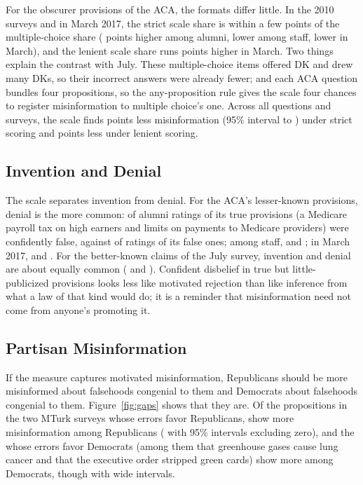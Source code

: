 \documentclass[11pt]{article}
\begin{document}
For the obscurer provisions of the ACA, the formats differ little. In the 2010 surveys and in March 2017, the strict scale share is within a few points of the multiple-choice share (\alumniStrict{} points higher among alumni, \staffStrict{} lower among staff, \marchStrict{} lower in March), and the lenient scale share runs \marchLenient{} points higher in March. Two things explain the contrast with July. These multiple-choice items offered DK and drew many DKs, so their incorrect answers were already fewer; and each ACA question bundles four propositions, so the any-proposition rule gives the scale four chances to register misinformation to multiple choice's one. Across all questions and surveys, the scale finds \pooledStrict{} points less misinformation (95\% interval \pooledStrictLower{} to \pooledStrictUpper{}) under strict scoring and \pooledLenient{} points less under lenient scoring.

\subsection{Invention and Denial}

The scale separates invention from denial. For the ACA's lesser-known provisions, denial is the more common: \denialAlumni{} of alumni ratings of its true provisions (a Medicare payroll tax on high earners and limits on payments to Medicare providers) were confidently false, against \inventionAlumni{} of ratings of its false ones; among staff, \denialStaff{} and \inventionStaff{}; in March 2017, \denialMarch{} and \inventionMarch{}. For the better-known claims of the July survey, invention and denial are about equally common (\inventionJuly{} and \denialJuly{}). Confident disbelief in true but little-publicized provisions looks less like motivated rejection than like inference from what a law of that kind would do; it is a reminder that misinformation need not come from anyone's promoting it.

\subsection{Partisan Misinformation}

If the measure captures motivated misinformation, Republicans should be more misinformed about falsehoods congenial to them and Democrats about falsehoods congenial to them. Figure~\ref{fig:gaps} shows that they are. Of the \nRcongenial{} propositions in the two MTurk surveys whose errors favor Republicans, \nRpositive{} show more misinformation among Republicans (\nRclear{} with 95\% intervals excluding zero), and the \nDcongenial{} whose errors favor Democrats (among them that greenhouse gases cause lung cancer and that the executive order stripped green cards) show more among Democrats, though with wide intervals.
\end{document}
